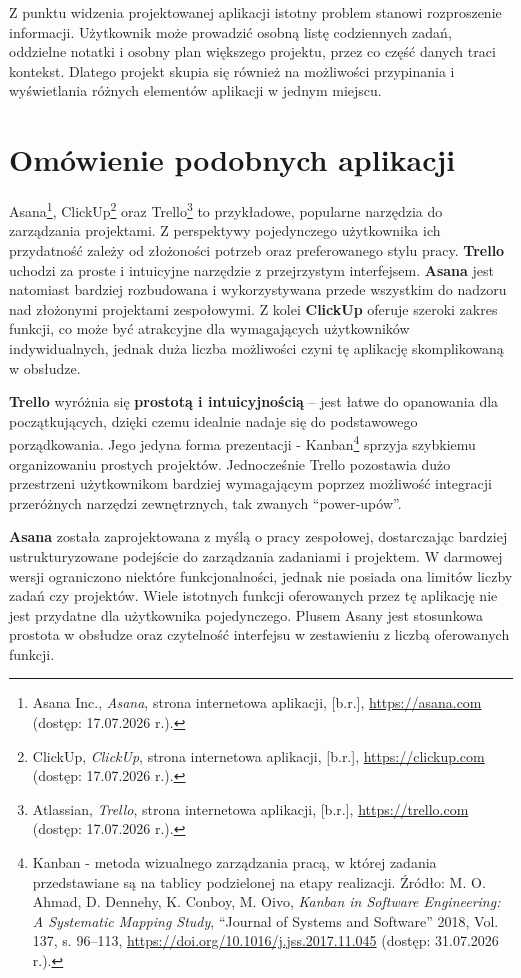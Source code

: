\documentclass[12pt,a4paper,twoside]{report}
\newcommand{\FirstParagraph}{\noindent\ignorespaces}
\begin{document}
Z punktu widzenia projektowanej aplikacji istotny problem stanowi rozproszenie informacji. Użytkownik może prowadzić osobną listę codziennych zadań, oddzielne notatki i osobny plan większego projektu, przez co część danych traci kontekst. Dlatego projekt skupia się również na możliwości przypinania i wyświetlania różnych elementów aplikacji w jednym miejscu.

\section{Omówienie podobnych aplikacji}

\FirstParagraph Asana\footnote{Asana Inc., \emph{Asana}, strona internetowa aplikacji, [b.r.], \url{https://asana.com} (dostęp: 17.07.2026 r.).}, ClickUp\footnote{ClickUp, \emph{ClickUp}, strona internetowa aplikacji, [b.r.], \url{https://clickup.com} (dostęp: 17.07.2026 r.).} oraz Trello\footnote{Atlassian, \emph{Trello}, strona internetowa aplikacji, [b.r.], \url{https://trello.com} (dostęp: 17.07.2026 r.).} to przykładowe, popularne narzędzia do zarządzania projektami. Z perspektywy pojedynczego użytkownika ich przydatność zależy od złożoności potrzeb oraz preferowanego stylu pracy. \textbf{Trello} uchodzi za proste i intuicyjne narzędzie z przejrzystym interfejsem. \textbf{Asana} jest natomiast bardziej rozbudowana i wykorzystywana przede wszystkim do nadzoru nad złożonymi projektami zespołowymi. Z kolei \textbf{ClickUp} oferuje szeroki zakres funkcji, co może być atrakcyjne dla wymagających użytkowników indywidualnych, jednak duża liczba możliwości czyni tę aplikację skomplikowaną w obsłudze.

\textbf{Trello} wyróżnia się \textbf{prostotą i intuicyjnością} -- jest łatwe do opanowania dla początkujących, dzięki czemu idealnie nadaje się do podstawowego porządkowania. Jego jedyna forma prezentacji - Kanban\footnote{Kanban - metoda wizualnego zarządzania pracą, w której zadania przedstawiane są na tablicy podzielonej na etapy realizacji. Źródło: M. O. Ahmad, D. Dennehy, K. Conboy, M. Oivo, \emph{Kanban in Software Engineering: A Systematic Mapping Study}, ``Journal of Systems and Software'' 2018, Vol. 137, s. 96--113, \url{https://doi.org/10.1016/j.jss.2017.11.045} (dostęp: 31.07.2026 r.).} sprzyja szybkiemu organizowaniu prostych projektów. Jednocześnie Trello pozostawia dużo przestrzeni użytkownikom bardziej wymagającym poprzez możliwość integracji przeróżnych narzędzi zewnętrznych, tak zwanych ``power-upów''.

\textbf{Asana} została zaprojektowana z myślą o pracy zespołowej, dostarczając bardziej ustrukturyzowane podejście do zarządzania zadaniami i projektem. W darmowej wersji ograniczono niektóre funkcjonalności, jednak nie posiada ona limitów liczby zadań czy projektów. Wiele istotnych funkcji oferowanych przez tę aplikację nie jest przydatne dla użytkownika pojedynczego. Plusem Asany jest stosunkowa prostota w obsłudze oraz czytelność interfejsu w zestawieniu z liczbą oferowanych funkcji.
\end{document}
